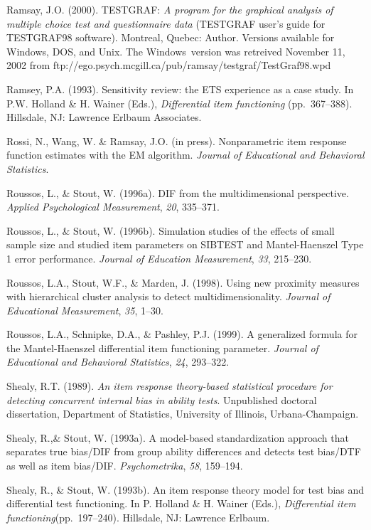 \documentclass[titlepage,11pt,twoside]{article}
\begin{document}
\begin{thebibliography}
\bibitem Ramsay, J.O. (2000). TESTGRAF: \textit{A program for the graphical analysis of multiple choice test and questionnaire data} (TESTGRAF user's guide for TESTGRAF98 software). Montreal, Quebec: Author. Versions available for Windows\textregistered, DOS, and Unix. The Windows\textregistered\ version was retreived November 11, 2002 from \mbox{ftp://ego.psych.mcgill.ca/pub/ramsay/testgraf/TestGraf98.wpd}

\bibitem Ramsey, P.A. (1993). Sensitivity review: the ETS experience as a case study. In P.W. Holland \& H. Wainer (Eds.), \textit{Differential item functioning} (pp.~367--388). Hillsdale, NJ: Lawrence Erlbaum Associates.

\bibitem Rossi, N., Wang, W. \& Ramsay, J.O. (in press). Nonparametric item response function estimates with the EM algorithm. \textit{Journal of Educational and Behavioral Statistics}.

\bibitem Roussos, L., \& Stout, W. (1996a). DIF from the multidimensional perspective. \textit{Applied Psychological Measurement}, \textit{20}, 335--371.

\bibitem Roussos, L., \& Stout, W. (1996b). Simulation studies of the effects of small sample size and studied item parameters on SIBTEST and Mantel-Haenszel Type 1 error performance. \textit{Journal of Education Measurement}, \textit{33}, 215--230.

\bibitem Roussos, L.A., Stout, W.F., \& Marden, J. (1998). Using new proximity measures with hierarchical cluster analysis to detect multidimensionality. \textit{Journal of Educational Measurement}, \textit{35}, 1--30.

\bibitem Roussos, L.A., Schnipke, D.A., \& Pashley, P.J. (1999). A generalized formula for the Mantel-Haenszel differential item functioning parameter. \textit{Journal of Educational and Behavioral Statistics}, \textit{24}, 293--322.

\bibitem Shealy, R.T. (1989). \textit{An item response theory-based statistical procedure for detecting concurrent internal bias in ability tests}. Unpublished doctoral dissertation, Department of Statistics, University of Illinois, Urbana-Champaign.

Shealy, R.,\& Stout, W. (1993a). A model-based standardization approach that separates true bias/DIF from group ability differences and detects test bias/DTF as well as item bias/DIF. \textit{Psychometrika}, \textit{58}, 159--194.

\bibitem Shealy, R., \& Stout, W. (1993b). An item response theory model for test bias and differential test functioning. In P. Holland \& H. Wainer (Eds.), \textit{Differential item functioning}(pp.~197--240). Hillsdale, NJ: Lawrence Erlbaum.


\end{thebibliography}
\end{document}
